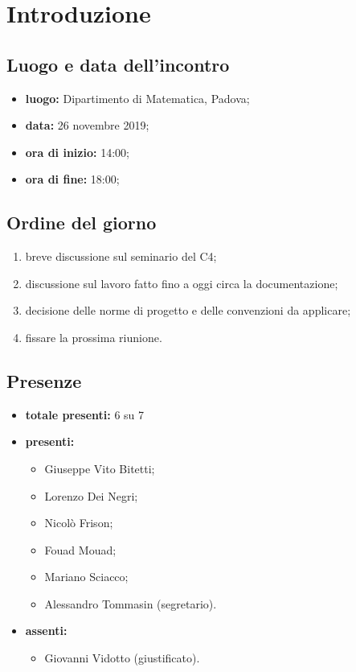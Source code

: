 \section*{Introduzione}

\subsection*{Luogo e data dell'incontro}
	\begin{itemize}
		\item \textbf{luogo:} Dipartimento di Matematica, Padova;
		\item \textbf{data:} 26 novembre 2019;
		\item \textbf{ora di inizio:} 14:00;
		\item \textbf{ora di fine:} 18:00;

	\end{itemize}

\subsection*{Ordine del giorno}
	\begin{enumerate}

		\item breve discussione sul seminario del  C4;
		\item discussione sul lavoro fatto fino a oggi circa la documentazione;
		\item decisione delle norme di progetto e delle convenzioni da applicare;
		\item fissare la prossima riunione.

	\end{enumerate}

\subsection*{Presenze}
	\begin{itemize}
		\item \textbf{totale presenti:} 6 su 7
		\item \textbf{presenti: }
			\begin{itemize}
				\item Giuseppe Vito Bitetti;
				\item Lorenzo Dei Negri;
				\item Nicolò Frison;
				\item Fouad Mouad;
				\item Mariano Sciacco;
				\item Alessandro Tommasin (segretario).
			\end{itemize}
		\item \textbf{assenti: } 
			\begin{itemize}	
				\item Giovanni Vidotto (giustificato).
			\end{itemize}
	\end{itemize}


